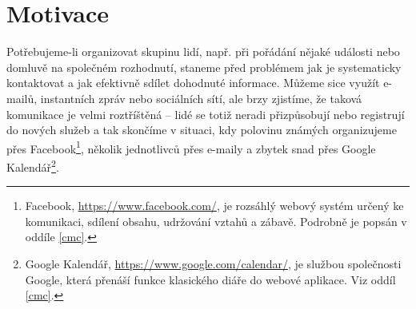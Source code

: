 \documentclass[12pt,oneside,final]{fithesis2}
\begin{document}







\chapter{Motivace}\label{motivation}
Potřebujeme-li organizovat skupinu lidí, např. při pořádání nějaké události nebo domluvě na společném rozhodnutí, staneme před problémem jak je systematicky kontaktovat a jak efektivně sdílet dohodnuté informace. Můžeme sice využít e-mailů, instantních zpráv nebo sociálních sítí, ale brzy zjistíme, že taková komunikace je velmi roztříštěná -- lidé se totiž neradi přizpůsobují nebo registrují do nových služeb a tak skončíme v situaci, kdy polovinu známých organizujeme přes Facebook\footnote{Facebook, \url{https://www.facebook.com/}, je rozsáhlý webový systém určený ke komunikaci, sdílení obsahu, udržování vztahů a zábavě. Podrobně je popsán v oddíle \ref{cmc}.}, několik jednotlivců přes e-maily a zbytek snad přes Google Kalendář\footnote{Google Kalendář, \url{https://www.google.com/calendar/}, je službou společnosti Google, která přenáší funkce klasického diáře do webové aplikace. Viz oddíl \ref{cmc}.}.
\end{document}
